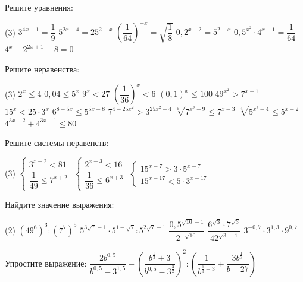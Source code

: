 \begin{class}[number=5]
	\begin{listofex}
		\item Решите уравнения:
		\begin{tasks}(3)
			\task \( 3^{4x-1}=\dfrac{1}{9} \)
			\task \( 5^{2x-4}=25^{2-x} \)
			\task \( \left(\dfrac{1}{64}\right)^{-x}=\sqrt{\dfrac{1}{8}} \)
			\task \( 0,2^{x-2}=5^{2-x} \)
			\task \( 0,5^{x^2}\cdot 4^{x+1}=\dfrac{1}{64} \)
			\task \( 4^x-2^{2x+1}-8=0 \)
		\end{tasks}
		\item Решите неравенства: %
		\begin{tasks}(3)
			\task \( 2^x \le 4 \)
			\task \( 0,04 \le 5^x \)
			\task \( 9^x < 27 \)
			\task \( \left( \dfrac{1}{36} \right)^x < 6  \)
			\task \( (0,1)^x \le 100 \)
			\task \( 49^{x^2}>7^{x+1} \)
			\task \( 15^x<25\cdot 3^x \)
			\task \( 6^{8-5x} \le 5^{5x-8} \)
			\task \( 7^{4-25x^2} > 3^{25x^2-4} \)
			\task \( \sqrt[6]{7^{x^2-9}} \le 7^{x-3} \)
			\task \( \sqrt[4]{5^{x^2-4}} \le 5^{x-2} \)
			\task \( 4^{3x-2} + 4^{3x-1} \le 80 \)
		\end{tasks}
		\item Решите системы неравенств:
		\begin{tasks}(3)
			\task \( \begin{cases} 3^{x-2}<81 \\ \dfrac{1}{49} \le 7^{x+2} \end{cases} \)
			\task \( \begin{cases} 2^{x-3}<16 \\ \dfrac{1}{36} \le 6^{x+3} \end{cases} \)
			\task \( \begin{cases} 15^{x-7}>3 \cdot 5^{x-7} \\ 15^{x-17}<5 \cdot 3^{x-17} \end{cases} \)
		\end{tasks}
		\item Найдите значение выражения:
		\begin{tasks}(2)
			\task \( (49^6)^3:(7^7)^5 \)
			\task \( 5^{3\sqrt{7}-1}\cdot 5^{1-\sqrt{7}}:5^{2\sqrt{7}-1} \)
			\task \( \dfrac{0,5^{\sqrt{10}-1}}{2^{-\sqrt{10}}} \)
			\task \( \dfrac{6^{\sqrt{3}}\cdot7^{\sqrt{3}}}{42^{\sqrt{3}-1}} \)
			\task \( 3^{-0,7}\cdot 3^{1,3} \cdot 9^{0,7}\)
		\end{tasks}
		\item Упростите выражение: \( \dfrac{2b^{0,5}}{b^{0,5}-3^{1,5}} - \left( \dfrac{b^{\tfrac{1}{3}}+3}{b^{0,5}-3^{\tfrac{3}{2}}} \right)^2 : \left( \dfrac{1}{b^{\tfrac{1}{3}-3}} + \dfrac{3b^{\tfrac{1}{3}}}{b-27} \right) \)
	\end{listofex}
\end{class}
	
